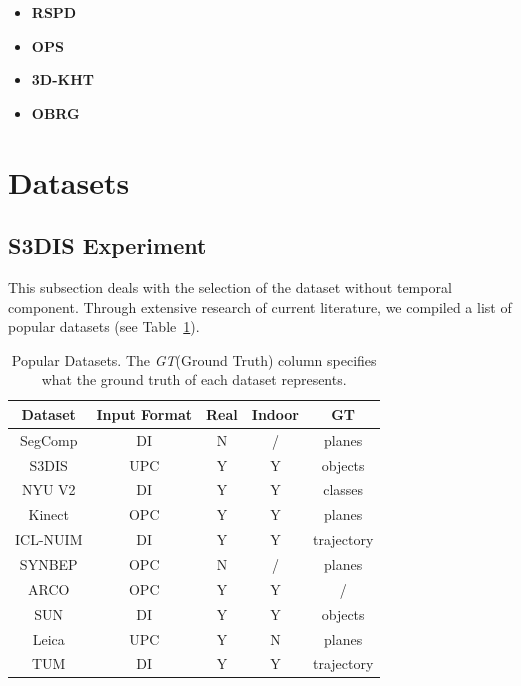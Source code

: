 \documentclass[main.tex]{subfiles}
\begin{document}
\begin{itemize}
    \item \textbf{RSPD}
    \item \textbf{OPS}
    \item \textbf{3D-KHT}
    \item \textbf{OBRG}
\end{itemize}

\section{Datasets}

\subsection{S3DIS Experiment}
This subsection deals with the selection of the dataset without temporal component.
Through extensive research of current literature, we compiled a list of popular datasets (see Table~\ref{tab:datasets}).
\begin{table}[]
    \centering
    \begin{tabular}{c|cccc}
        Dataset                                                                & Input Format & Real & Indoor & GT         \\ \hline
        SegComp      \cite{article}                                            & DI           & N    & /      & planes     \\
        S3DIS   \cite{armeni_cvpr16}                                           & UPC          & Y    & Y      & objects    \\
        NYU V2  \cite{10.1007/978-3-642-33715-4_54}                            & DI           & Y    & Y      & classes    \\
        Kinect  \cite{Oehler_Stueckler_Welle_Schulz_Behnke_2011}               & OPC          & Y    & Y      & planes     \\
        ICL-NUIM       \cite{handa:etal:ICRA2014}                              & DI           & Y    & Y      & trajectory \\
        SYNBEP         \cite{schaefer19icra}                                   & OPC          & N    & /      & planes     \\
        ARCO          \cite{Hidalgo-Paniagua_Vega-Rodríguez_Pavón_Ferruz_2015} & OPC          & Y    & Y      & /          \\
        SUN                    \cite{7298655}                                  & DI           & Y    & Y      & objects    \\
        Leica          \cite{leica}                                            & UPC          & Y    & N      & planes     \\
        TUM              \cite{sturm12iros}                                    & DI           & Y    & Y      & trajectory
    \end{tabular}
    \caption[Popular Datasets]{Popular Datasets. The \textit{GT}(Ground Truth) column specifies what the ground truth of each dataset represents.}
    \label{tab:datasets}
\end{table}
\end{document}
